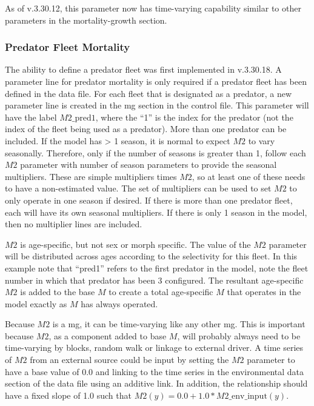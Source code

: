 As of v.3.30.12, this parameter now has time-varying capability similar to other parameters in the mortality-growth section.

\subsubsection{Predator Fleet Mortality}
The ability to define a predator fleet was first implemented in v.3.30.18. A parameter line for predator mortality is only required if a predator fleet has been defined in the data file. For each fleet that is designated as a predator, a new parameter line is created in the \gls{mg} section in the control file. This parameter will have the label $M2\text{\_pred1}$, where the ``1'' is the index for the predator (not the index of the fleet being used as a predator). More than one predator can be included. If the model has > 1 season, it is normal to expect $M2$ to vary seasonally. Therefore, only if the number of seasons is greater than 1, follow each $M2$ parameter with number of season parameters to provide the seasonal multipliers. These are simple multipliers times $M2$, so at least one of these needs to have a non-estimated value. The set of multipliers can be used to set $M2$ to only operate in one season if desired. If there is more than one predator fleet, each will have its own seasonal multipliers. If there is only 1 season in the model, then no multiplier lines are included. 

$M2$ is age-specific, but not sex or morph specific. The value of the $M2$ parameter will be distributed across ages according to the selectivity for this fleet. In this example note that ``pred1'' refers to the first predator in the model, note the fleet number in which that predator has been 3 configured. The resultant age-specific $M2$ is added to the base $M$ to create a total age-specific $M$ that operates in the model exactly as $M$ has always operated. 

Because $M2$ is a \gls{mg}, it can be time-varying like any other \gls{mg}. This is important because $M2$, as a component added to base $M$, will probably always need to be time-varying by blocks, random walk or linkage to external driver. A time series of $M2$ from an external source could be input by setting the $M2$ parameter to have a base value of 0.0 and linking to the time series in the environmental data section of the data file using an additive link. In addition, the relationship should have a fixed slope of 1.0 such that $M2(y) = 0.0 + 1.0 * M2\text{\_env\_input}(y)$. 

